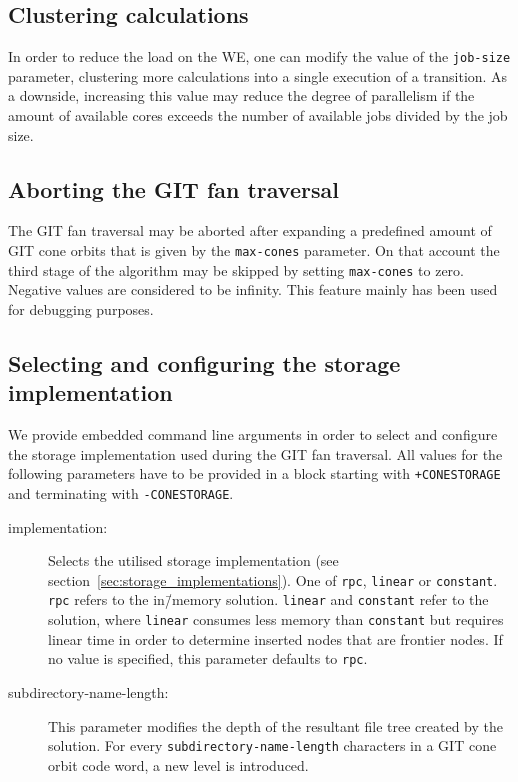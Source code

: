 \subsection*{Clustering calculations}

In order to reduce the load on the \ac{WE}, one can modify the value of the \texttt{job-size} parameter, clustering more calculations into a single execution of a transition. As a downside, increasing this value may reduce the degree of parallelism if the amount of available cores exceeds the number of available jobs divided by the job size.

\subsection*{Aborting the GIT fan traversal}

The GIT fan traversal may be aborted after expanding a predefined amount of GIT cone orbits that is given by the \texttt{max-cones} parameter. On that account the third stage of the algorithm may be skipped by setting \texttt{max-cones} to zero. Negative values are considered to be infinity. This feature mainly has been used for debugging purposes.

\subsection*{Selecting and configuring the storage implementation}

We provide embedded command line arguments in order to select and configure the storage implementation used during the GIT fan traversal. All values for the following parameters have to be provided in a block starting with \texttt{+CONESTORAGE} and terminating with \texttt{-CONESTORAGE}.

\begin{description}
	\item[implementation:] Selects the utilised storage implementation (see section~\ref{sec:storage_implementations}). One of \texttt{rpc}, \texttt{linear} or \texttt{constant}. \texttt{rpc} refers to the in\=/memory solution. \texttt{linear} and \texttt{constant} refer to the \beegfs{} solution, where \texttt{linear} consumes less memory than \texttt{constant} but requires linear time in order to determine inserted nodes that are frontier nodes. If no value is specified, this parameter defaults to \texttt{rpc}.
	\item[subdirectory-name-length:] This parameter modifies the depth of the resultant file tree created by the \beegfs{} solution. For every \texttt{subdirectory-name-length} characters in a GIT cone orbit code word, a new level is introduced.
\end{description}

